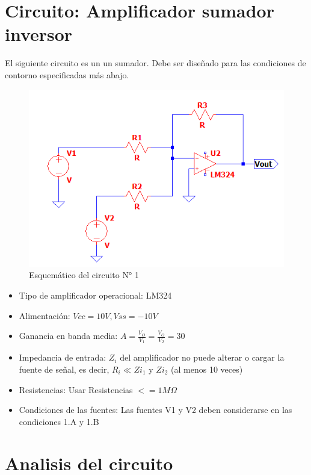 \section{Circuito: Amplificador sumador inversor}

El siguiente circuito es un un sumador. Debe ser diseñado para las condiciones de contorno especificadas más abajo.

\begin{figure}[h!]
    \centering
    \includegraphics[width=0.90\linewidth]{img/Circuito1.png}
    \caption{Esquemático del circuito N° 1}
    \label{fig:esquematico_complete}
\end{figure}

\begin{itemize}
  \item Tipo de amplificador operacional: LM324
  \item Alimentación: $Vcc = 10V, Vss = -10V$
  \item Ganancia en banda media: $A = \frac{V_O}{V_1} = \frac{V_O}{V_2} = 30$
  \item Impedancia de entrada: $Z_i$ del amplificador no puede alterar o cargar la fuente de señal, es decir, $R_i  \ll Zi_1$ y $Zi_2$ (al menos 10 veces)
  
  \item Resistencias: Usar Resistencias $<= 1M \Omega$
  \item Condiciones de las fuentes: Las fuentes V1 y V2 deben considerarse en las condiciones 1.A y 1.B

\end{itemize}





\section{Analisis del circuito}

